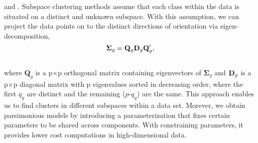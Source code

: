 \documentclass[11pt]{article}
\begin{document}
and \citet{bouveyron2014model}. Subspace clustering methods assume that each class within the data is situated on a distinct and unknown subspace. With this assumption, we can project the data points on to the distinct directions of orientation via eigen-decomposition, \\ 
$$\boldsymbol{\Sigma}_g = \bold{Q}_g\bold{D}_g\bold{Q}_g',$$ \\
where $\boldsymbol{Q}_g$ is a p$\times$p orthogonal matrix containing eigenvectors of $\boldsymbol{\Sigma}_g$ and $\bold{D}_g$ is a p$\times$p diagonal matrix with p eigenvalues sorted in decreasing order, where the first $q_g$ are distinct and the remaining ($p$-$q_g$) are the same. 
This approach enables us to find clusters in different subspaces within a data set. Morever, we obtain parsimonious models by introducing a parameterization that fixes certain parameters to be shared across components. With constraining parameters, it provides lower cost computations in high-dimensional data.
\\
\end{document}
